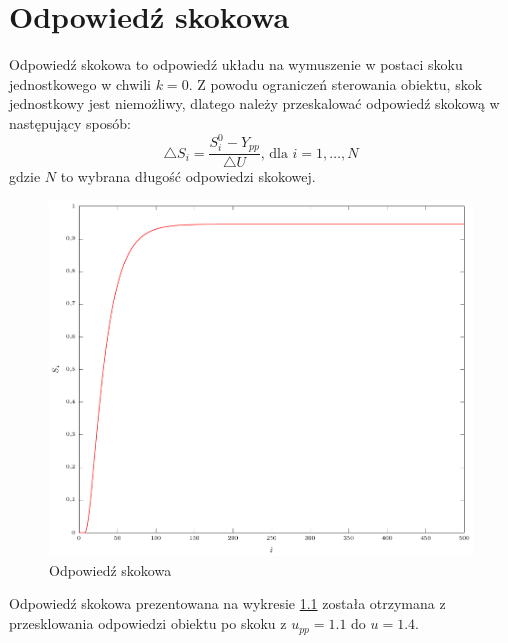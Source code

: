 \chapter{Odpowiedź skokowa}
Odpowiedź skokowa to odpowiedź układu na wymuszenie w postaci skoku jednostkowego w chwili $k=0$. Z powodu ograniczeń sterowania obiektu, skok jednostkowy jest niemożliwy, dlatego należy przeskalować odpowiedź skokową w następujący sposób:
\begin{equation}
\triangle{S_i} = \frac{S_i^0-Y_{pp}}{\triangle{U}}\textrm{, dla } i=1,\ldots,N
\end{equation}
gdzie $N$ to wybrana długość odpowiedzi skokowej.
\begin{figure}[tb]
\centering
\includegraphics[scale=1]{wykresy/odp_skok}
\caption{Odpowiedź skokowa}
\label{odp_skok}
\end{figure}
Odpowiedź skokowa prezentowana na wykresie \ref{odp_skok} została otrzymana z przesklowania odpowiedzi obiektu po skoku z $u_{pp}=\num{1.1}$ do $u=\num{1.4}$.